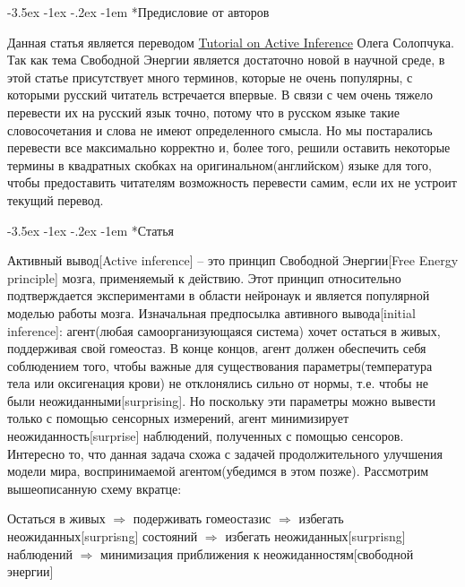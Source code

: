 \documentclass[twoside,leqno, 11pt]{article}
\author{Махнева Елизавета, Брсикян Бабкен \\ БЭК171}
\makeatletter
\renewcommand\section{\@startsection{section}{1}{\z@}%
        {-3.5ex \@plus -1ex \@minus -.2ex}%
        {-1em}%
        {\normalfont\large\scshape\bfseries}}
\makeatother
\begin{document}
	
\section*{Предисловие от авторов}~\

	Данная статья является переводом \href{https://medium.com/@solopchuk/tutorial-on-active-inference-30edcf50f5dc}{Tutorial on Active Inference} Олега Солопчука. Так как тема Свободной Энергии является достаточно новой в научной среде, в этой статье присутствует много терминов, которые не очень популярны, с которыми русский читатель встречается впервые. В связи с чем очень тяжело перевести их на русский язык точно, потому что в русском языке такие словосочетания и слова не имеют определенного смысла. Но мы постарались перевести все максимально корректно и, более того, решили оставить некоторые термины в квадратных скобках на оригинальном(английском) языке для того, чтобы предоставить читателям возможность перевести самим, если их не устроит текущий перевод.

\section*{Статья}~\

	Активный вывод[Active inference] -- это принцип Свободной Энергии[Free Energy principle] мозга, применяемый к действию. Этот принцип относительно подтверждается экспериментами в области нейронаук и является популярной моделью работы мозга. Изначальная предпосылка автивного вывода[initial inference]: агент(любая самоорганизующаяся система) хочет остаться в живых, поддерживая свой гомеостаз. В конце концов, агент должен обеспечить себя соблюдением того, чтобы важные для существования параметры(температура тела или оксигенация крови) не отклонялись сильно от нормы, т.е. чтобы не были неожиданными[surprising]. Но поскольку эти параметры можно вывести только с помощью сенсорных измерений, агент минимизирует неожиданность[surprise] наблюдений, полученных с помощью сенсоров. Интересно то, что данная задача схожа с задачей продолжительного улучшения модели мира, воспринимаемой агентом(убедимся в этом позже). Рассмотрим вышеописанную схему вкратце:
	
\begin{center}
	Остаться в живых $\Rightarrow$ подерживать гомеостазис $\Rightarrow$ избегать неожиданных[surprisng] состояний $\Rightarrow$ избегать неожиданных[surprisng] наблюдений $\Rightarrow$ минимизация приближения к неожиданностям[свободной энергии]
\end{center}
	
\end{document}
